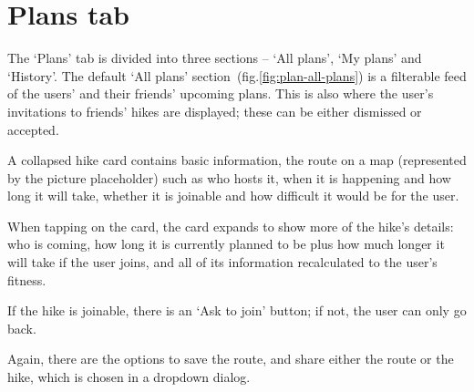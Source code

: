 \section{Plans tab}
The `Plans' tab is divided into three sections -- `All plans', `My plans' and `History'.
The default `All plans' section~(fig.\ref{fig:plan-all-plans}) is a filterable feed of the users' and their friends' upcoming plans.
This is also where the user's invitations to friends' hikes are displayed; these can be either dismissed or accepted.

A collapsed hike card contains basic information, the route on a map (represented by the picture placeholder) such as who hosts it, when it is happening and how long it will take, whether it is joinable and how difficult it would be for the user.

When tapping on the card, the card expands to show more of the hike's details: 
who is coming, how long it is currently planned to be plus how much longer it will take if the user joins, and all of its information recalculated to the user's fitness.

If the hike is joinable, there is an `Ask to join' button; if not, the user can only go back.

Again, there are the options to save the route, and share either the route or the hike, which is chosen in a dropdown dialog.

